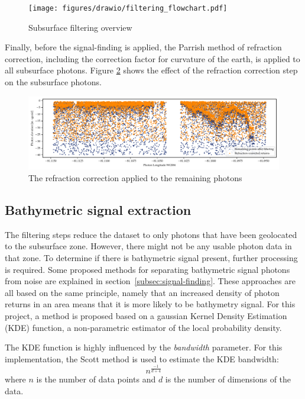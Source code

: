\begin{figure}[htb]
    \centering
    \texttt{[image: figures/drawio/filtering\_flowchart.pdf]}
    \caption{Subsurface filtering overview}
    \label{fig:filtering-flowchart}
\end{figure}

Finally, before the signal-finding is applied, the Parrish method of refraction correction, including the correction factor for curvature of the earth, is applied to all subsurface photons. Figure \ref{fig:refraction-photons} shows the effect of the refraction correction step on the subsurface photons.

\begin{figure}[htb]
    \centering
    \includegraphics[width=\textwidth]{figures/methodology_refraction.pdf}
    \caption{The refraction correction applied to the remaining photons}
    \label{fig:refraction-photons}
\end{figure}

\subsection{Bathymetric signal extraction}\label{subsec:kdesignalfinding}

The filtering steps reduce the dataset to only photons that have been geolocated to the subsurface zone. However, there might not be any usable photon data in that zone. To determine if there is bathymetric signal present, further processing is required. Some proposed methods for separating bathymetric signal photons from noise are explained in section~\ref{subsec:signal-finding}. These approaches are all based on the same principle, namely that an increased density of photon returns in an area means that it is more likely to be bathymetry signal. For this project, a method is proposed based on a gaussian Kernel Density Estimation (KDE) function, a non-parametric estimator of the local probability density. 

The KDE function is highly influenced by the \emph{bandwidth} parameter. For this implementation, the Scott method \parencite{Scott2015} is used to estimate the KDE bandwidth: $$ n^{\frac{-1}{d+4}} $$ where $n$ is the number of data points and $d$ is the number of dimensions of the data. 

